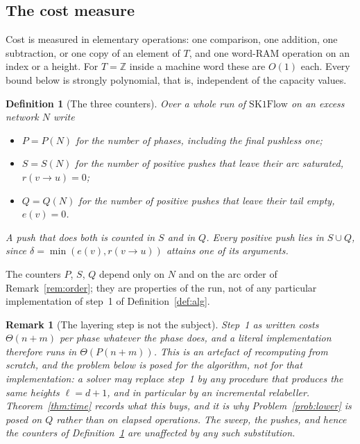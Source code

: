 \documentclass[10pt]{article}
\newtheorem{definition}{Definition}
\newtheorem{remark}[theorem]{Remark}
\newcommand{\SKF}{\text{SK1Flow}}
\newcommand{\arc}[2]{#1\!\to\!#2}
\begin{document}
\subsection{The cost measure}

Cost is measured in elementary operations: one comparison, one addition, one
subtraction, or one copy of an element of $T$, and one word-RAM operation on an
index or a height. For $T=\mathbb{Z}$ inside a machine word these are $O(1)$
each. Every bound below is strongly polynomial, that is, independent of the
capacity values.

\begin{definition}[The three counters]\label{def:counters}
Over a whole run of $\SKF$ on an excess network $N$ write
\begin{itemize}
  \item $P=P(N)$ for the number of phases, including the final pushless one;
  \item $S=S(N)$ for the number of positive pushes that leave their arc
  saturated, $r(\arc{v}{u})=0$;
  \item $Q=Q(N)$ for the number of positive pushes that leave their tail empty,
  $e(v)=0$.
\end{itemize}
A push that does both is counted in $S$ and in $Q$. Every positive push lies in
$S\cup Q$, since $\delta=\min(e(v),r(\arc{v}{u}))$ attains one of its
arguments.
\end{definition}

The counters $P$, $S$, $Q$ depend only on $N$ and on the arc order of
Remark~\ref{rem:order}; they are properties of the run, not of any particular
implementation of step~1 of Definition~\ref{def:alg}.

\begin{remark}[The layering step is not the subject]\label{rem:layering}
Step~1 as written costs $\Theta(n+m)$ per phase whatever the phase does, and a
literal implementation therefore runs in $\Theta(P(n+m))$. This is an artefact
of recomputing from scratch, and the problem below is posed for the
\emph{algorithm}, not for that implementation: a solver may replace step~1 by
any procedure that produces the same heights $\ell=d+1$, and in particular by
an incremental relabeller. Theorem~\ref{thm:time} records what this buys, and
it is why Problem~\ref{prob:lower} is posed on $Q$ rather than on elapsed
operations. The sweep, the
pushes, and hence the counters of Definition~\ref{def:counters} are unaffected
by any such substitution.
\end{remark}
\end{document}

